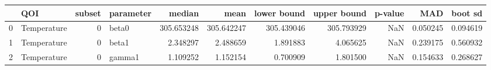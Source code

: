\begin{tabular}{llrlrrrrrrr}
\toprule
{} &          QOI &  subset & parameter &      median &        mean &  lower bound &  upper bound &  p-value &       MAD &   boot sd \\
\midrule
0 &  Temperature &       0 &     beta0 &  305.653248 &  305.642247 &   305.439046 &   305.793929 &      NaN &  0.050245 &  0.094619 \\
1 &  Temperature &       0 &     beta1 &    2.348297 &    2.488659 &     1.891883 &     4.065625 &      NaN &  0.239175 &  0.560932 \\
2 &  Temperature &       0 &    gamma1 &    1.109252 &    1.152154 &     0.700909 &     1.801500 &      NaN &  0.154633 &  0.268627 \\
\bottomrule
\end{tabular}
